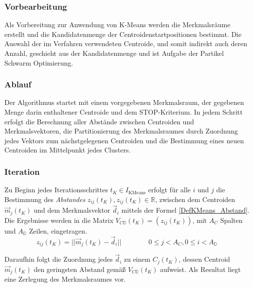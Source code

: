 \subsubsection{Vorbearbeitung}
  Als Vorbereitung zur Anwendung von K-Means werden die Merkmalsräume erstellt und die Kandidatenmenge der Centroidenstartpositionen bestimmt. Die Auswahl der im Verfahren verwendeten Centroide, und somit indirekt auch deren Anzahl, geschieht aus der Kandidatenmenge und ist Aufgabe der Partikel Schwarm Optimierung.

\subsubsection{Ablauf}
  Der Algorithmus startet mit einem vorgegebenen Merkmalsraum, der gegebenen Menge darin enthaltener Centroide und dem STOP-Kriterium. In jedem Schritt erfolgt die Berechnung aller Abstände zwischen Centroiden und Merkmalsvektoren, die Partitionierung des Merkmalsraumes durch Zuordnung jedes Vektors zum nächstgelegenen Centroiden und die Bestimmung eines neuen Centroiden im Mittelpunkt jedes Clusters.

\subsubsection{Iteration}
  Zu Beginn jedes Iterationsschrittes $t_K\in I_\textrm{KMeans}$ erfolgt für alle $i$ und $j$ die Bestimmung des \textit{Abstandes} $z_{ij}(t_K),z_{ij}(t_K)\in\mathbb{R}$, zwischen dem Centroiden $\vec{m}_j(t_K)$ und dem Merkmalsvektor $\vec{d}_i$ mittels der Formel \ref{DefKMeans_Abstand}. Die Ergebnisse werden in die Matrix $V_{C\mathbb{D}}(t_K) = (z_{ij}(t_K))$, mit $A_C$ Spalten und $A_{\mathbb{D}}$ Zeilen, eingetragen.
  \cite{Liju2006}
  \begin{equation}\label{DefKMeans_Abstand}
    z_{ij}(t_K) = || \vec{m}_j(t_K) - \vec{d}_i || \qquad\qquad 0\leq j < A_C, 0\leq i < A_{\mathbb{D}}
  \end{equation}
  
  \noindent Daraufhin folgt die Zuordnung jedes $\vec{d}_i$ zu einem $C_j(t_K)$, dessen Centroid $\vec{m}_j(t_K)$ den geringsten Abstand gemäß $V_{C\mathbb{D}}(t_K)$ aufweist. Als Resultat liegt eine Zerlegung des Merkmalsraumes vor.\\

